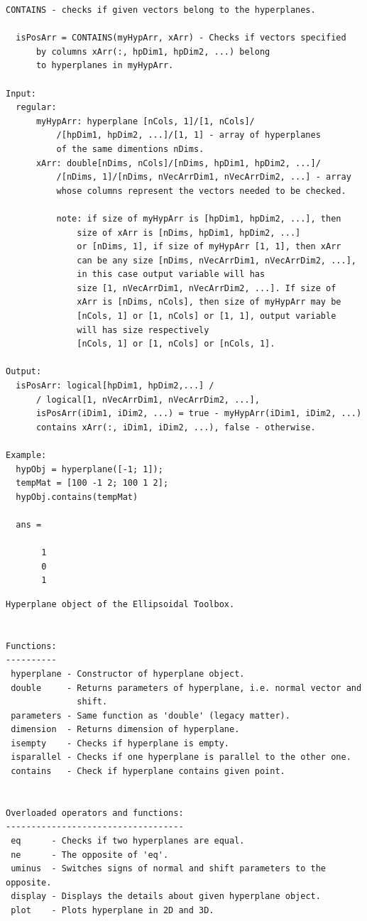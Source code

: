 \documentclass[letterpaper,10pt,english]{sphinxmanual}
\begin{document}
\begin{Verbatim}[commandchars=\\\{\}]
CONTAINS - checks if given vectors belong to the hyperplanes.

  isPosArr = CONTAINS(myHypArr, xArr) - Checks if vectors specified
      by columns xArr(:, hpDim1, hpDim2, ...) belong
      to hyperplanes in myHypArr.

Input:
  regular:
      myHypArr: hyperplane [nCols, 1]/[1, nCols]/
          /[hpDim1, hpDim2, ...]/[1, 1] - array of hyperplanes
          of the same dimentions nDims.
      xArr: double[nDims, nCols]/[nDims, hpDim1, hpDim2, ...]/
          /[nDims, 1]/[nDims, nVecArrDim1, nVecArrDim2, ...] - array
          whose columns represent the vectors needed to be checked.

          note: if size of myHypArr is [hpDim1, hpDim2, ...], then
              size of xArr is [nDims, hpDim1, hpDim2, ...]
              or [nDims, 1], if size of myHypArr [1, 1], then xArr
              can be any size [nDims, nVecArrDim1, nVecArrDim2, ...],
              in this case output variable will has
              size [1, nVecArrDim1, nVecArrDim2, ...]. If size of
              xArr is [nDims, nCols], then size of myHypArr may be
              [nCols, 1] or [1, nCols] or [1, 1], output variable
              will has size respectively
              [nCols, 1] or [1, nCols] or [nCols, 1].

Output:
  isPosArr: logical[hpDim1, hpDim2,...] /
      / logical[1, nVecArrDim1, nVecArrDim2, ...],
      isPosArr(iDim1, iDim2, ...) = true - myHypArr(iDim1, iDim2, ...)
      contains xArr(:, iDim1, iDim2, ...), false - otherwise.

Example:
  hypObj = hyperplane([-1; 1]);
  tempMat = [100 -1 2; 100 1 2];
  hypObj.contains(tempMat)

  ans =

       1
       0
       1
\end{Verbatim}

\begin{Verbatim}[commandchars=\\\{\}]
Hyperplane object of the Ellipsoidal Toolbox.


Functions:
----------
 hyperplane - Constructor of hyperplane object.
 double     - Returns parameters of hyperplane, i.e. normal vector and
              shift.
 parameters - Same function as 'double' (legacy matter).
 dimension  - Returns dimension of hyperplane.
 isempty    - Checks if hyperplane is empty.
 isparallel - Checks if one hyperplane is parallel to the other one.
 contains   - Check if hyperplane contains given point.


Overloaded operators and functions:
-----------------------------------
 eq      - Checks if two hyperplanes are equal.
 ne      - The opposite of 'eq'.
 uminus  - Switches signs of normal and shift parameters to the opposite.
 display - Displays the details about given hyperplane object.
 plot    - Plots hyperplane in 2D and 3D.
\end{Verbatim}
\end{document}

